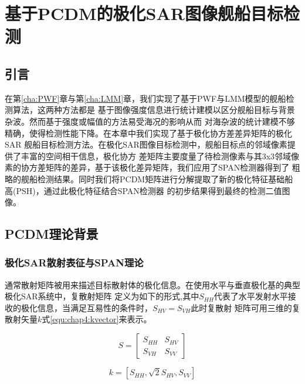 \chapter{基于PCDM的极化SAR图像舰船目标检测}
\label{cha:PCDM}

\section{引言}
\label{sec:chap4:sec1}
在第\ref{cha:PWF}章与第\ref{cha:LMM}章，我们实现了基于PWF与LMM模型的舰船检测算法，这两种方法都是
基于图像强度信息进行统计建模以区分舰船目标与背景杂波。然而基于强度或幅值的方法易受海况的影响从而
对海杂波的统计建模不够精确，使得检测性能下降。在本章中我们实现了基于极化协方差差异矩阵的极化SAR
舰船目标检测方法。在极化SAR图像目标检测中，舰船目标点的邻域像素提供了丰富的空间相干信息，极化协方
差矩阵主要度量了待检测像素与其3x3邻域像素的协方差矩阵的差异，基于该极化差异矩阵，我们应用了SPAN检测器得到了
粗略的舰船检测结果。同时我们将PCDM矩阵进行分解提取了新的极化特征基础船高(PSH)，通过此极化特征结合SPAN检测器
的初步结果得到最终的检测二值图像。




\section{PCDM理论背景}
\label{sec:chap4:sec2}
\subsection{极化SAR散射表征与SPAN理论}
    通常散射矩阵被用来描述目标散射体的极化信息。在使用水平与垂直极化基的典型极化SAR系统中，复散射矩阵
    定义为如下的形式,其中$S_{HH}$代表了水平发射水平接收的极化信息，当满足互易性的条件时，$S_{HV}=S_{VH}$此时复散射
    矩阵可用三维的复散射矢量$k$式\ref{equ:chap4:kvector}来表示。

    \begin{equation}
        \label{equ:chap4:Smatrix}
        S = \left[ {\begin{array}{*{20}{c}}
        {{S_{HH}}}&{{S_{HV}}}\\
        {{S_{VH}}}&{{S_{VV}}}
        \end{array}} \right]
    \end{equation}

    \begin{equation}
        \label{equ:chap4:kvector}
        k = [{S_{HH}},\sqrt 2 {S_{HV}},{S_{VV}}]
    \end{equation}


